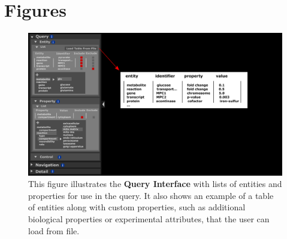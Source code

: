 
\newpage

\section{Figures}

\begin{figure}[htbp]
\includegraphics[scale=0.5]{sketch_2017-01-02_1}
\centering
\caption{This figure illustrates the \textbf{Query Interface} with lists of entities and properties for use in the query. It also shows an example of a table of entities along with custom properties, such as additional biological properties or experimental attributes, that the user can load from file.}
\label{fig:2017-01-02_1}
\end{figure}

